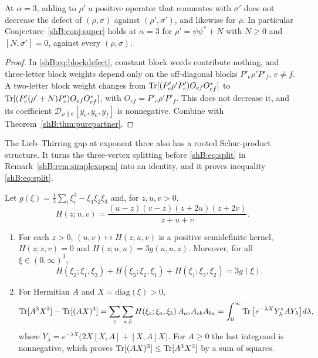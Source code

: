 \begin{corollary}\label{shB:cor:noise}
At $\alpha=3$, adding to $\rho'$ a positive operator that commutes with $\sigma'$ does not decrease the defect of $(\rho,\sigma)$ against $(\rho',\sigma')$, and likewise for $\rho$. In particular Conjecture~\ref{shB:conj:super} holds at $\alpha=3$ for $\rho'=\psi\psi^*+N$ with $N\ge0$ and $[N,\sigma']=0$, against every $(\rho,\sigma)$.
\end{corollary}

\begin{proof}
In \eqref{shB:eq:blockdefect}, constant block words contribute nothing, and three-letter block weights depend only on the off-diagonal blocks $P'_e\rho'P'_f$, $e\ne f$. A two-letter block weight changes from $\operatorname{Tr}[(P'_e\rho'P'_e)O_{ef}O_{ef}^*]$ to $\operatorname{Tr}[(P'_e(\rho'+N)P'_e)O_{ef}O_{ef}^*]$, with $O_{ef}=P'_e\rho'P'_f$. This does not decrease it, and its coefficient $\mathcal D_{\rho\|\sigma}[y_e,y_e,y_f]$ is nonnegative. Combine with Theorem~\ref{shB:thm:purepartner}.
\end{proof}

The Lieb--Thirring gap at exponent three also has a rooted Schur-product structure. It turns the three-vertex splitting before \eqref{shB:eq:split} in Remark~\ref{shB:rem:simplexopen} into an identity, and it proves inequality \eqref{shB:eq:split}.

\begin{proposition}\label{shB:prop:rootedLT}
Let $g(\xi)=\frac13\sum_i\xi_i^3-\xi_1\xi_2\xi_3$ and, for $z,u,v>0$,
\[
H(z;u,v)=\frac{(u-z)(v-z)(z+2u)(z+2v)}{z+u+v}.
\]
\begin{enumerate}[label=(\alph*)]
\item For each $z>0$, $(u,v)\mapsto H(z;u,v)$ is a positive semidefinite kernel, $H(z;z,v)=0$ and $H(z;u,u)=3g(u,u,z)$. Moreover, for all $\xi\in(0,\infty)^3$,
\[
H(\xi_2;\xi_1,\xi_3)+H(\xi_3;\xi_2,\xi_1)+H(\xi_1;\xi_3,\xi_2)=3g(\xi).
\]
\item For Hermitian $A$ and $X=\mathrm{diag}(\xi)>0$,
\[
\operatorname{Tr}[A^3X^3]-\operatorname{Tr}[(AX)^3]=\sum_c\sum_{a,b}H(\xi_c;\xi_a,\xi_b)\,A_{ac}A_{cb}A_{ba}=\int_0^\infty\operatorname{Tr}\big[e^{-\lambda X}Y_\lambda^*AY_\lambda\big]d\lambda,
\]
where $Y_\lambda=e^{-\lambda X}\big(2X[X,A]+[X,A]X\big)$.
For $A\ge0$ the last integrand is nonnegative, which proves $\operatorname{Tr}[(AX)^3]\le\operatorname{Tr}[A^3X^3]$ by a sum of squares.
\end{enumerate}
\end{proposition}

